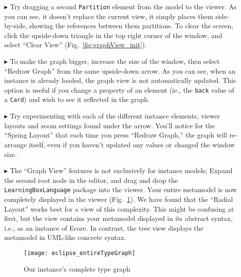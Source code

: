 \begin{itemize}
\item[$\blacktriangleright$] Try dragging a second \texttt{Partition} element from the model to the viewer. As you can see, it doesn't replace the current
view, it simply places them side-by-side, showing the references between them partitions. To clear the screen, click the upside-down triangle in the top
right corner of the window, and select ``Clear View'' (Fig.~\ref{fig:graphView_init}).

\item[$\blacktriangleright$] To make the graph bigger, increase the size of the window, then select ``Redraw Graph'' from the same upside-down arrow. As you can
see, when an instance is already loaded, the graph view is not automatically updated. This option is useful if you change a property of an element (ie., the
\texttt{back} value of a \texttt{Card}) and wish to see it reflected in the graph.

\item[$\blacktriangleright$] Try experimenting with each of the different instance elements, viewer layouts and zoom settings found under the arrow. You'll
notice for the ``Spring Layout'' that each time you press ``Redraw Graph,'' the graph will re-arrange itself, even if you haven't updated any values or changed the window size.

\item[$\blacktriangleright$] The ``Graph View'' features is not exclusively for instance models; Expand the second root node in the editor, and drag and
drop the \texttt{LearningBoxLanguage} package into the viewer. Your entire metamodel is now completely displayed in the viewer
(Fig.~\ref{fig:graphView_typeGraph}). We have found that the ``Radial Layout'' works best for a view of this complexity. This might be confusing at first, but
the view contains your metamodel displayed in its abstract syntax, i.e., as an instance of Ecore. In contrast, the tree view displays the metamodel in UML-like
concrete syntax.

\vspace{1cm}

\begin{figure}[htbp]
	\centering
  \texttt{[image: eclipse\_entireTypeGraph]}
	\caption{Our instance's complete type graph}
	\label{fig:graphView_typeGraph}
\end{figure}


\end{itemize}
